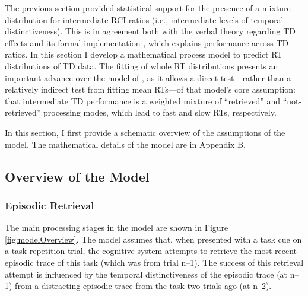 \documentclass[a4paper, jou, natbib]{apa6}
\begin{document}
The previous section provided statistical support for the presence of a mixture-distribution for intermediate RCI ratios (i.e., intermediate levels of temporal distinctiveness). This is in agreement both with the verbal theory regarding TD effects \cite{Horoufchin2011a} and its formal implementation \cite{Grange2015}, which explains performance across TD ratios. In this section I develop a mathematical process model to predict RT distributions of TD data. The fitting of whole RT distributions presents an important advance over the model of \citet{Grange2015}, as it allows a direct test---rather than a relatively indirect test from fitting mean RTs---of that model's core assumption: that intermediate TD performance is a weighted mixture of ``retrieved'' and ``not-retrieved'' processing modes, which lead to fast and slow RTs, respectively. 

In this section, I first provide a schematic overview of the assumptions of the model. The mathematical details of the model are in Appendix B.

\subsection{Overview of the Model}

\subsubsection{Episodic Retrieval}
The main processing stages in the model are shown in Figure \ref{fig:modelOverview}. The model assumes that, when presented with a task cue on a task repetition trial, the cognitive system attempts to retrieve the most recent episodic trace of this task (which was from trial n--1). The success of this retrieval attempt is influenced by the temporal distinctiveness of the episodic trace (at n--1) from a distracting episodic trace from the task two trials ago (at n--2).  
\end{document}

